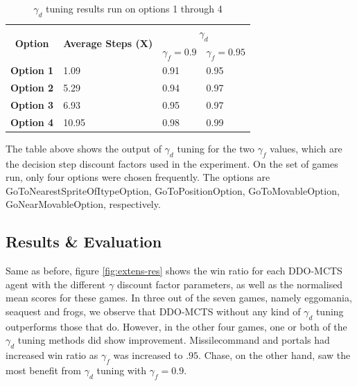 \documentclass[12pt,a4paper]{article}
\begin{document}
\begin{multicols}{2}
\begin{table}[H]
\scriptsize
\begin{tabular}{|l|l|l|l|}
\hline
\multicolumn{1}{|c|}{\multirow{2}{*}{\textbf{Option}}} & \multicolumn{1}{c|}{\multirow{2}{*}{\textbf{Average Steps (X)}}} & \multicolumn{2}{c|}{\textbf{$\gamma_d$}} \\ \cline{3-4} 
\multicolumn{1}{|c|}{}                                 & \multicolumn{1}{c|}{}                                            & $\gamma_f = 0.9$    & $\gamma_f = 0.95$    \\ \hline
\textbf{Option 1}                & 1.09                                                             & 0.91              & 0.95               \\ \hline
\textbf{Option 2}                            & 5.29                                                             & 0.94              & 0.97               \\ \hline
\textbf{Option 3}                             & 6.93                                                             & 0.95              & 0.97               \\ \hline
\textbf{Option 4}                           & 10.95                                                            & 0.98              & 0.99               \\ \hline
\end{tabular}
\caption{$\gamma_d$ tuning results run on options 1 through 4}
\end{table}

The table above shows the output of $\gamma_d$ tuning for the two $\gamma_f$ values, which are the decision step discount factors used in the experiment. On the set of games run, only four options were chosen frequently. The options are GoToNearestSpriteOfItypeOption, GoToPositionOption, GoToMovableOption, GoNearMovableOption, respectively.

\subsection{Results & Evaluation}
Same as before, figure \ref{fig:extens-res} shows the win ratio for each DDO-MCTS agent with the different $\gamma$ discount factor parameters, as well as the normalised mean scores for these games. In three out of the seven games, namely eggomania, seaquest and frogs, we observe that DDO-MCTS without any kind of $\gamma_d$ tuning outperforms those that do. However, in the other four games, one or both of the $\gamma_d$ tuning methods did show improvement. Missilecommand and portals had increased win ratio as $\gamma_f$ was increased to $.95$. Chase, on the other hand, saw the most benefit from $\gamma_d$ tuning with $\gamma_f = 0.9$.


\end{multicols}
\end{document}
